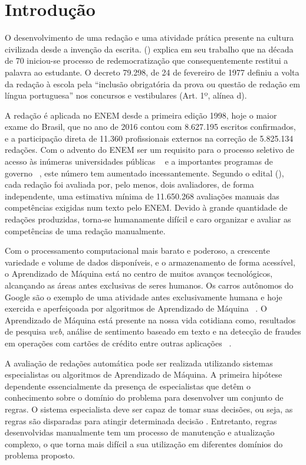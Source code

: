 \section{Introdução}
\noindent O desenvolvimento de uma redação e uma atividade prática presente na 
cultura civilizada desde a invenção da escrita.  
(\citeyear{lara:1995}) explica em seu trabalho que na década de 70 iniciou-se 
processo de redemocratização que consequentemente restitui a palavra ao 
estudante. O decreto 79.298, de 24 de fevereiro de 1977 definiu a volta da 
redação à escola pela ``inclusão obrigatória da prova ou questão de redação em 
língua portuguesa'' nos concursos e vestibulares (Art. 1º, alínea d).

A redação é aplicada no ENEM desde a primeira edição 1998, hoje o maior exame 
do Brasil, que no ano de 2016 contou com 8.627.195 escritos confirmados, e a 
participação direta de 11.360 profissionais externos na correção de 5.825.134 
redações. Com o advento do ENEM ser um requisito para o processo seletivo de 
acesso às inúmeras universidades públicas ~\cite{sisu:2017} e a importantes 
programas de governo ~\cite{csf:2017}, este número tem aumentado 
incessantemente. Segundo o edital \citeauthor{edital_enem:2016} 
(\citeyear{edital_enem:2016}), cada redação foi avaliada por, 
pelo menos, dois avaliadores, de forma independente, uma estimativa mínima de 
11.650.268 avaliações manuais das competências exigidas num texto pelo ENEM. 
Devido à grande quantidade de redações produzidas, torna-se humanamente difícil 
e caro organizar e avaliar as competências de uma redação manualmente.

Com o processamento computacional mais barato e poderoso, a crescente variedade 
e volume de dados disponíveis, e o armazenamento de forma acessível, 
o Aprendizado de Máquina está no centro de muitos avanços tecnológicos, 
alcançando as áreas antes exclusivas de seres humanos. Os carros autônomos do 
Google são o exemplo de uma atividade antes exclusivamente humana e hoje 
exercida e aperfeiçoada por algoritmos de Aprendizado de Máquina 
~\cite{waymo:2017}. O Aprendizado de Máquina está presente na nossa vida 
cotidiana como, resultados de pesquisa \textit{web}, análise de sentimento 
baseado em texto e na detecção de fraudes em operações com cartões de crédito 
entre outras aplicações ~\cite{batista1999aplicando}.

A avaliação de redações automática pode ser realizada utilizando sistemas
especialistas ou algoritmos de Aprendizado de Máquina. A primeira hipótese 
dependente essencialmente da presença de especialistas que detêm o 
conhecimento sobre o domínio do problema para desenvolver um conjunto de 
regras. O sistema especialista deve ser capaz de tomar suas decisões, ou seja, 
as regras são disparadas para atingir determinada decisão 
\cite{negnevitsky2005artificial}. Entretanto, regras desenvolvidas manualmente 
tem um processo de manutenção e atualização complexo, o que torna mais difícil 
a sua utilização em diferentes domínios do problema proposto.

